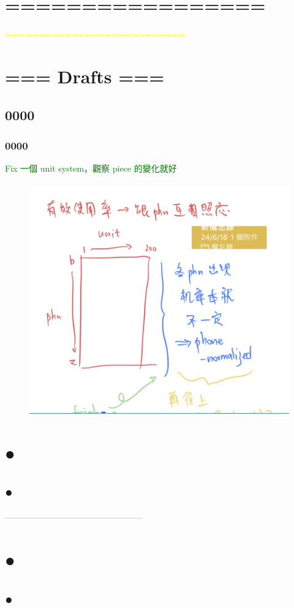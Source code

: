 
\chapter{=================}
  \textcolor{yellow}{===========================}
\chapter{=== Drafts ===}

\section{0000}  


\subsection{0000}  {

 
\textcolor{green}{Fix 一個 unit system，觀察 piece 的變化就好 }
\begin{figure}
    \centering
    \includegraphics[width=0.5\linewidth]{feasiblefigs/ch4figs/drafts/0.png}
\end{figure}
}

\chapter{●}\section{●}  %

  \textcolor{magenta}{------------------------------------------------}
\chapter{●}\section{●}  %
